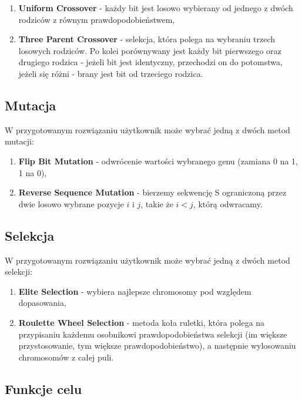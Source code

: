 \documentclass{classrep}
\begin{document}
\begin{enumerate}
    \item \textbf{Uniform Crossover} - każdy bit jest losowo wybierany od jednego z dwóch rodziców z równym prawdopodobieństwem,
    \item \textbf{Three Parent Crossover} - selekcja, która polega na wybraniu trzech losowych rodziców. Po kolei porównywany jest każdy bit pierwszego oraz drugiego rodzica - jeżeli bit jest identyczny, przechodzi on do potomstwa, jeżeli się różni - brany jest bit od trzeciego rodzica.
\end{enumerate}

\subsection{Mutacja}

W przygotowanym rozwiązaniu użytkownik może wybrać jedną z dwóch metod mutacji:

\begin{enumerate}
    \item \textbf{Flip Bit Mutation} - odwrócenie wartości wybranego genu (zamiana 0 na 1, 1 na 0),
    \item \textbf{Reverse Sequence Mutation} - bierzemy sekwencję S ograniczoną przez dwie losowo wybrane pozycje $i$ i $j$, takie że $i < j$, którą odwracamy.
\end{enumerate}

\subsection{Selekcja}

W przygotowanym rozwiązaniu użytkownik może wybrać jedną z dwóch metod selekcji:

\begin{enumerate}
    \item \textbf{Elite Selection} - wybiera najlepsze chromosomy pod względem dopasowania,
    \item \textbf{Roulette Wheel Selection} - metoda koła ruletki, która polega na przypisaniu każdemu osobnikowi prawdopodobieństwa selekcji (im większe przystosowanie, tym większe prawdopodobieństwo), a następnie wylosowaniu chromosomów z całej puli.
\end{enumerate}

\subsection{Funkcje celu}
\end{document}
